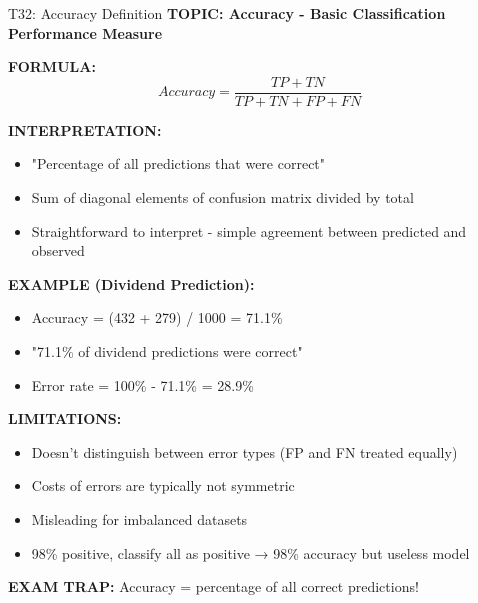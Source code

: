 \documentclass[8pt]{beamer}
\begin{document}
	\begin{frame}{T32: Accuracy Definition}
		\fontsize{6.5}{7.5}\selectfont
		\textbf{TOPIC: Accuracy - Basic Classification Performance Measure}
		
		\vspace{0.1cm}
		\textbf{FORMULA:}
		\[
		Accuracy = \frac{TP + TN}{TP + TN + FP + FN}
		\]
		
		\vspace{0.1cm}
		\textbf{INTERPRETATION:}
		\begin{itemize}
			\item "Percentage of all predictions that were correct"
			\item Sum of diagonal elements of confusion matrix divided by total
			\item Straightforward to interpret - simple agreement between predicted and observed
		\end{itemize}
		
		\vspace{0.1cm}
		\textbf{EXAMPLE (Dividend Prediction):}
		\begin{itemize}
			\item Accuracy = (432 + 279) / 1000 = 71.1\%
			\item "71.1\% of dividend predictions were correct"
			\item Error rate = 100\% - 71.1\% = 28.9\%
		\end{itemize}
		
		\vspace{0.1cm}
		\textbf{LIMITATIONS:}
		\begin{itemize}
			\item Doesn't distinguish between error types (FP and FN treated equally)
			\item Costs of errors are typically not symmetric
			\item Misleading for imbalanced datasets
			\item 98\% positive, classify all as positive → 98\% accuracy but useless model
		\end{itemize}
		
		\textcolor{myred}{\textbf{EXAM TRAP:}} Accuracy = \textcolor{myblue}{percentage of all correct predictions}!
	\end{frame}
	
\end{document}

